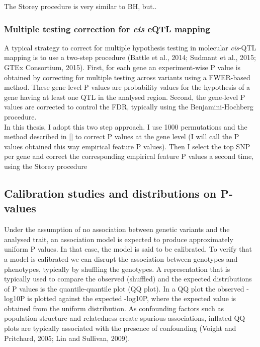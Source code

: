The Storey procedure is very similar to BH, but..

\subsubsection{Multiple testing correction for \textit{cis} eQTL mapping}

A typical strategy to correct for multiple hypothesis testing in molecular  \textit{cis}-QTL mapping is to use a two-step procedure (Battle et al., 2014; Sudmant et al., 2015; GTEx
Consortium, 2015). 
First, for each gene an experiment-wise P value is obtained by correcting for multiple testing across variants using a FWER-based method. 
These gene-level P values are probability values for the hypothesis of a gene having at least
one QTL in the analysed region. 
Second, the gene-level P values are corrected to control the FDR, typically using the Benjamini-Hochberg procedure.\\

In this thesis, I adopt this two step approach.
I use 1000 permutations and the method described in [] to correct P values at the gene level (I will call the P values obtained this way empirical feature P values).
Then I select the top SNP per gene and correct the corresponding empirical feature P values a second time, using the Storey procedure

\subsection{Calibration studies and distributions on P-values}

Under the assumption of no association between genetic variants and the analysed trait, an association model is expected to produce approximately uniform P values.
In that case, the model is said to be calibrated.
To verify that a model is calibrated we can disrupt the association between genotypes and phenotypes, typically by shuffling the genotypes. 
A representation that is typically used to compare the observed (shuffled) and the expected distributions of P values is the quantile-quantile plot (QQ plot). 
In a QQ plot the observed -log10P is plotted against the expected -log10P, where the expected value is obtained from the uniform distribution. 
As confounding factors such as population structure and relatedness create spurious associations, inflated QQ plots are typically associated with the presence of confounding (Voight and Pritchard, 2005; Lin and Sullivan, 2009). 

